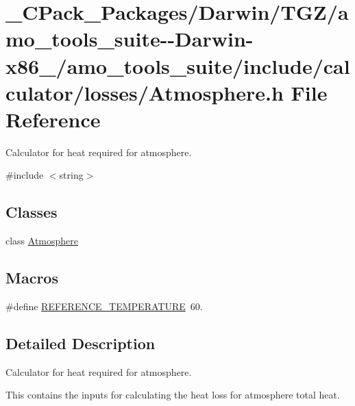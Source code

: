 \hypertarget{___c_pack___packages_2_darwin_2_t_g_z_2amo__tools__suite--_darwin-x86__64_2amo__tools__suite_2in12df9ea953cbf92325683074c641f026}{}\section{\+\_\+\+C\+Pack\+\_\+\+Packages/\+Darwin/\+T\+G\+Z/amo\+\_\+tools\+\_\+suite-\/-\/\+Darwin-\/x86\+\_/amo\+\_\+tools\+\_\+suite/include/calculator/losses/\+Atmosphere.h File Reference}
\label{___c_pack___packages_2_darwin_2_t_g_z_2amo__tools__suite--_darwin-x86__64_2amo__tools__suite_2in12df9ea953cbf92325683074c641f026}


Calculator for heat required for atmosphere.  


{\ttfamily \#include $<$string$>$}\newline
\subsection*{Classes}
\begin{DoxyCompactItemize}
\item 
class \hyperlink{class_atmosphere}{Atmosphere}
\end{DoxyCompactItemize}
\subsection*{Macros}
\begin{DoxyCompactItemize}
\item 
\#define \hyperlink{___c_pack___packages_2_darwin_2_t_g_z_2amo__tools__suite--_darwin-x86__64_2amo__tools__suite_2in12df9ea953cbf92325683074c641f026_a4fb3326b931fe94b2ec5f8acfbdd56a8}{R\+E\+F\+E\+R\+E\+N\+C\+E\+\_\+\+T\+E\+M\+P\+E\+R\+A\+T\+U\+RE}~60.
\end{DoxyCompactItemize}


\subsection{Detailed Description}
Calculator for heat required for atmosphere. 

This contains the inputs for calculating the heat loss for atmosphere total heat.

